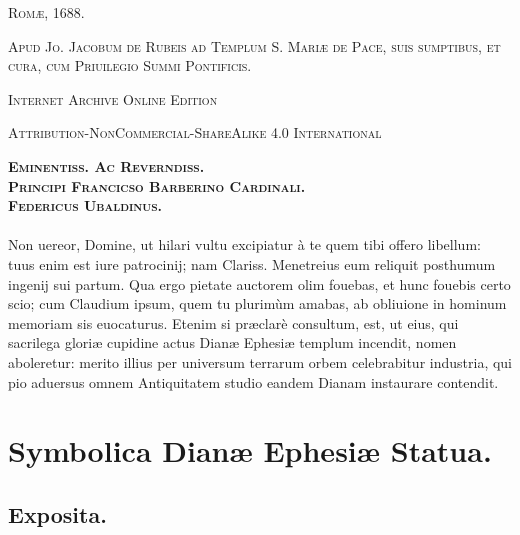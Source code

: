 \documentclass[a4paper, 11pt, oneside, polutonikogreek, latin]{article}
\begin{document}
\begin{titlepage}
	\vspace{1\baselineskip}

	{\small\scshape Romæ, 1688.}
	
	{\small\scshape{Apud Jo. Jacobum de Rubeis ad Templum S. Mariæ de Pace, suis sumptibus, et cura, cum Priuilegio Summi Pontificis.}}
	
	\vspace{0.5\baselineskip} %

\scshape Internet Archive Online Edition%
	
	{\scshape\small Attribution-NonCommercial-ShareAlike 4.0 International} %
\end{titlepage}
\setlength{\parskip}{1mm plus1mm minus1mm}
\clearpage
\tableofcontents
\clearpage
\begin{center}
{\scshape\textbf{Eminentiss. Ac Reverndiss.\\Principi Francicso Barberino Cardinali.\\Federicus Ubaldinus.}}
\end{center}
\paragraph{}
Non uereor, Domine, ut hilari vultu excipiatur à te quem tibi offero libellum: tuus enim est iure patrocinij; nam Clariss. Menetreius eum reliquit posthumum ingenij sui partum. Qua ergo pietate auctorem olim fouebas, et hunc fouebis certo scio; cum Claudium ipsum, quem tu plurimùm amabas, ab obliuione in hominum memoriam sis euocaturus. Etenim si præclarè consultum, est, ut eius, qui sacrilega gloriæ cupidine actus Dianæ Ephesiæ templum incendit, nomen aboleretur: merito illius per universum terrarum orbem celebrabitur industria, qui pio aduersus omnem Antiquitatem studio eandem Dianam instaurare contendit.
\clearpage
\section{Symbolica Dianæ Ephesiæ Statua.}
\subsection{Exposita.}
\end{document}
